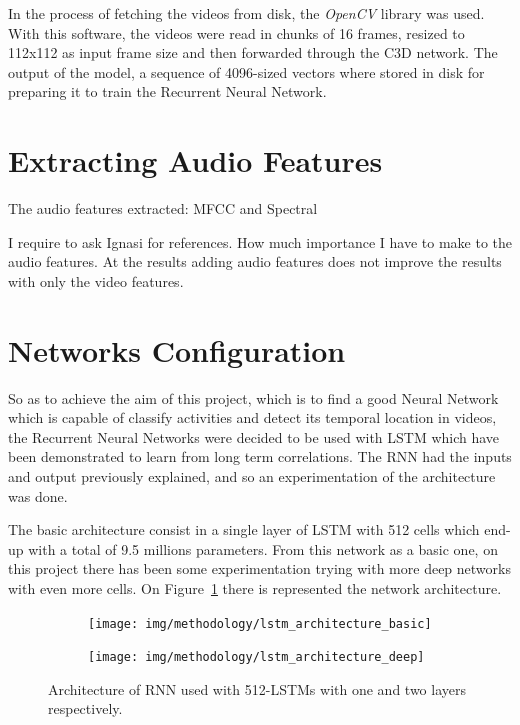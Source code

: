
In the process of fetching the videos from disk, the \textit{OpenCV}\cite{opencv_library} library was used. With this software, the videos were read in chunks of 16 frames, resized to 112x112 as input frame size and then forwarded through the C3D network. The output of the model, a sequence of 4096-sized vectors where stored in disk for preparing it to train the Recurrent Neural Network. %

\section{Extracting Audio Features}

The audio features extracted: MFCC and Spectral

I require to ask Ignasi for references. How much importance I have to make to the audio features. At the results adding audio features does not improve the results with only the video features.


\section{Networks Configuration}

So as to achieve the aim of this project, which is to find a good Neural Network which is capable of classify activities and detect its temporal location in videos, the Recurrent Neural Networks were decided to be used with LSTM which have been demonstrated to learn from long term correlations. The RNN had the inputs and output previously explained, and so an experimentation of the architecture was done. 

The basic architecture consist in a single layer of LSTM with 512 cells which end-up with a total of 9.5 millions parameters. From this network as a basic one, on this project there has been some experimentation trying with more deep networks with even more cells. On Figure~\ref{fig:lstm_architecture} there is represented the network architecture.

\begin{figure}[H]
\centering
\begin{subfigure}[b]{.5\textwidth}
  \centering
  \texttt{[image: img/methodology/lstm\_architecture\_basic]}
\end{subfigure}%
\begin{subfigure}[b]{.5\textwidth}
  \centering
  \texttt{[image: img/methodology/lstm\_architecture\_deep]}
\end{subfigure}
\caption{Architecture of RNN used with 512-LSTMs with one and two layers respectively.}
\label{fig:lstm_architecture}
\end{figure}

